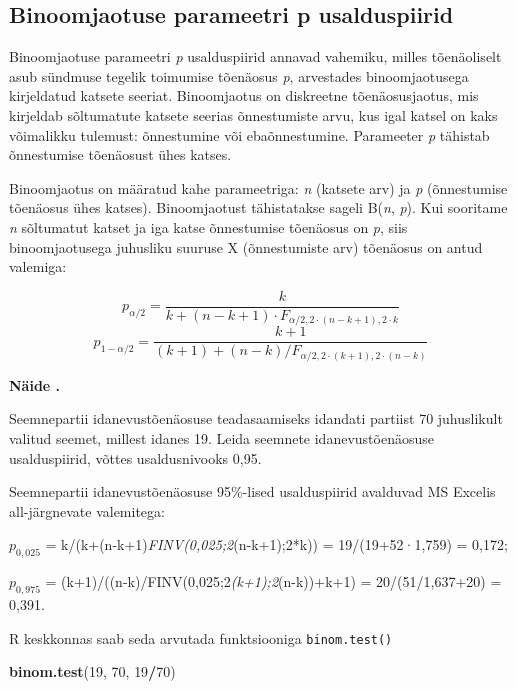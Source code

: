 \documentclass[
]{book}
\newenvironment{Shaded}{\begin{snugshade}}{\end{snugshade}}
\newcommand{\DecValTok}[1]{\textcolor[rgb]{0.00,0.00,0.81}{#1}}
\newcommand{\FunctionTok}[1]{\textcolor[rgb]{0.13,0.29,0.53}{\textbf{#1}}}
\newcommand{\NormalTok}[1]{#1}
\newcommand{\SpecialCharTok}[1]{\textcolor[rgb]{0.81,0.36,0.00}{\textbf{#1}}}
\newcounter{naidis}[chapter]
\newenvironment{naidis}
{%
\definecolor{shadecolor}{rgb}{200, 200, 0}
\par\parindent 0pt
\begin{framed}
\begin{naitefont}
\refstepcounter{naidis}\textbf{Näide \thenaidis.}
}
{%
\end{naitefont}%
\end{framed}
}%
\renewenvironment{Shaded} {\begin{snugshade}\footnotesize} {\end{snugshade}}
\begin{document}
\subsection{Binoomjaotuse parameetri p usalduspiirid}\label{binoomjaotuse-parameetri-p-usalduspiirid}

Binoomjaotuse parameetri \emph{p} usalduspiirid annavad vahemiku, milles tõenäoliselt asub sündmuse tegelik toimumise tõenäosus \emph{p}, arvestades binoomjaotusega kirjeldatud katsete seeriat. Binoomjaotus on diskreetne tõenäosusjaotus, mis kirjeldab sõltumatute katsete seerias õnnestumiste arvu, kus igal katsel on kaks võimalikku tulemust: õnnestumine või ebaõnnestumine. Parameeter \emph{p} tähistab õnnestumise tõenäosust ühes katses.

Binoomjaotus on määratud kahe parameetriga: \emph{n} (katsete arv) ja \emph{p} (õnnestumise tõenäosus ühes katses). Binoomjaotust tähistatakse sageli B(\emph{n}, \emph{p}). Kui sooritame \emph{n} sõltumatut katset ja iga katse õnnestumise tõenäosus on \emph{p}, siis binoomjaotusega juhusliku suuruse X (õnnestumiste arv) tõenäosus on antud valemiga:

\[p_{\alpha/2} = \frac{k}{k + (n-k + 1) \cdot F_{\alpha/2,2 \cdot (n-k+1), 2\cdot k}}\]
\[p_{1- \alpha/2} = \frac{k+1}{(k+1)+(n-k) / F_{\alpha/2,2\cdot (k+1), 2 \cdot (n-k)}}\]

\begin{naidis}
Seemnepartii idanevustõenäosuse teadasaamiseks idandati partiist 70 juhuslikult valitud seemet, millest idanes 19. Leida seemnete idanevustõenäosuse usalduspiirid, võttes usaldusnivooks 0,95.
\end{naidis}

Seemnepartii idanevustõenäosuse 95\%-lised usalduspiirid avalduvad MS Excelis all-järgnevate valemitega:

\(p_{0,025}\) = k/(k+(n-k+1)\emph{FINV(0,025;2}(n-k+1);2*k)) = 19/(19+52·1,759) = 0,172;

\(p_{0,975}\) = (k+1)/((n-k)/FINV(0,025;2\emph{(k+1);2}(n-k))+k+1) = 20/(51/1,637+20) = 0,391.

R keskkonnas saab seda arvutada funktsiooniga \texttt{binom.test()}

\begin{Shaded}
\begin{Highlighting}[]
\FunctionTok{binom.test}\NormalTok{(}\DecValTok{19}\NormalTok{, }\DecValTok{70}\NormalTok{, }\DecValTok{19}\SpecialCharTok{/}\DecValTok{70}\NormalTok{)}
\end{Highlighting}
\end{Shaded}
\end{document}
